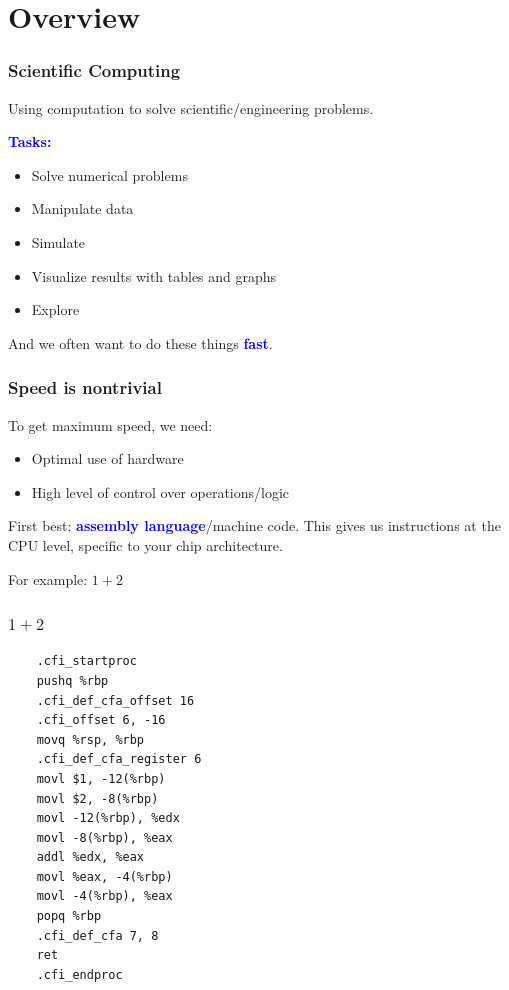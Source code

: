 \documentclass[
  xcolor={svgnames},
  hyperref={colorlinks,citecolor=DeepPink4,linkcolor=DarkRed,urlcolor=DarkBlue}
  ]{beamer}  %
\newcommand\boldblue[1]{\textcolor{blue}{\textbf{#1}}}
\begin{document}
\section{Overview}

\begin{frame}
  \frametitle{Scientific Computing}

  Using computation to solve scientific/engineering problems.

  \vspace{1em}
  \boldblue{Tasks:}
  \begin{itemize}
    \item Solve numerical problems
    \item Manipulate data
    \item Simulate
    \item Visualize results with tables and graphs
    \item Explore
  \end{itemize}

  \pause
  \vspace{1em}
  And we often want to do these things \boldblue{fast}.
\end{frame}

\begin{frame}
  \frametitle{Speed is nontrivial}

  To get maximum speed, we need:
  \begin{itemize}
    \item Optimal use of hardware
    \item High level of control over operations/logic
  \end{itemize}

  \vspace{1em}
  First best: \boldblue{assembly language}/machine code. This gives us
  instructions at the CPU level, specific to your chip architecture.

  \vspace{1em}
  For example: $1 + 2$

\end{frame}

\begin{frame}[fragile]
  \frametitle{$1 + 2$}

  \lstset{style=julia}
  \begin{lstlisting}
    .cfi_startproc
    pushq %rbp
    .cfi_def_cfa_offset 16
    .cfi_offset 6, -16
    movq %rsp, %rbp
    .cfi_def_cfa_register 6
    movl $1, -12(%rbp)
    movl $2, -8(%rbp)
    movl -12(%rbp), %edx
    movl -8(%rbp), %eax
    addl %edx, %eax
    movl %eax, -4(%rbp)
    movl -4(%rbp), %eax
    popq %rbp
    .cfi_def_cfa 7, 8
    ret
    .cfi_endproc
  \end{lstlisting}

\end{frame}
\end{document}
